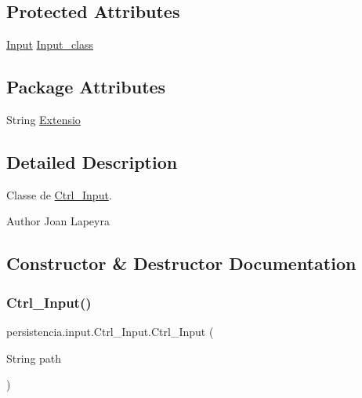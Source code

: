 \subsection*{Protected Attributes}
\begin{DoxyCompactItemize}
\item 
\hyperlink{classpersistencia_1_1input_1_1Input}{Input} \hyperlink{classpersistencia_1_1input_1_1Ctrl__Input_affe3c91673d80b61450970a69fe84611}{Input\+\_\+class}
\end{DoxyCompactItemize}
\subsection*{Package Attributes}
\begin{DoxyCompactItemize}
\item 
String \hyperlink{classpersistencia_1_1input_1_1Ctrl__Input_a6041b56aa31f01f75d02382f98e259e5}{Extensio}
\end{DoxyCompactItemize}


\subsection{Detailed Description}
Classe de \hyperlink{classpersistencia_1_1input_1_1Ctrl__Input}{Ctrl\+\_\+\+Input}. 

\begin{DoxyAuthor}{Author}
Joan Lapeyra 
\end{DoxyAuthor}


\subsection{Constructor \& Destructor Documentation}
\mbox{\label{classpersistencia_1_1input_1_1Ctrl__Input_a00f3fa14d0329d6e4b9ddbe39ada1258}} 
\subsubsection{\texorpdfstring{Ctrl\+\_\+\+Input()}{Ctrl\_Input()}}
{\footnotesize\ttfamily persistencia.\+input.\+Ctrl\+\_\+\+Input.\+Ctrl\+\_\+\+Input (\begin{DoxyParamCaption}\item[{String}]{path }\end{DoxyParamCaption})\hspace{0.3cm}{\ttfamily [inline]}}



